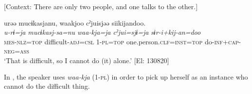 \ea\label{ex:6-93}
  [Context: There are only two people, and one talks to the other.]

{\TM}
\glll urəə  mucɨkasjanu,  waakjoo  cˀjuisjəə    siikijandoo.\\
\textit{u-rɨ=ja}  \textit{mucɨkasj-sa=nu}  \textit{waa-kja=ja}  \textit{cˀjui=sjɨ=ja}    \textit{sɨr-i+kij-an=doo}\\
    \textsc{mes}-\textsc{nlz}=\textsc{top}  difficult-\textsc{adj}=\textsc{csl}  1-\textsc{pl}=\textsc{top}  one.person.\textsc{clf}=\textsc{inst}=\textsc{top} do-\textsc{inf}+\textsc{cap}-\textsc{neg}=\textsc{ass}\\
\glt    ‘That is difficult, so I cannot do (it) alone.’ [El: 130820]
\z

In , the speaker uses \textit{waa-kja} (1-\textsc{pl}) in order to pick up herself as an instance who cannot do the difficult thing.

